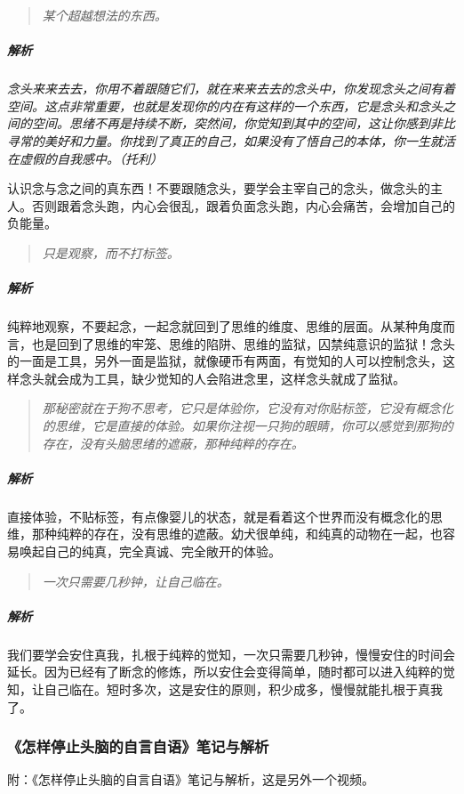 \begin{quote}\it
    某个超越想法的东西。
\end{quote}

\subparagraph{解析} \textit{念头来来去去，你用不着跟随它们，就在来来去去的念头中，你发现念头之间有着空间。这点非常重要，也就是发现你的内在有这样的一个东西，它是念头和念头之间的空间。思绪不再是持续不断，突然间，你觉知到其中的空间，这让你感到非比寻常的美好和力量。你找到了真正的自己，如果没有了悟自己的本体，你一生就活在虚假的自我感中。（托利）}

认识念与念之间的真东西！不要跟随念头，要学会主宰自己的念头，做念头的主人。否则跟着念头跑，内心会很乱，跟着负面念头跑，内心会痛苦，会增加自己的负能量。

\begin{quote}\it
    只是观察，而不打标签。
\end{quote}

\subparagraph{解析} 纯粹地观察，不要起念，一起念就回到了思维的维度、思维的层面。从某种角度而言，也是回到了思维的牢笼、思维的陷阱、思维的监狱，囚禁纯意识的监狱！念头的一面是工具，另外一面是监狱，就像硬币有两面，有觉知的人可以控制念头，这样念头就会成为工具，缺少觉知的人会陷进念里，这样念头就成了监狱。

\begin{quote}\it
    那秘密就在于狗不思考，它只是体验你，它没有对你贴标签，它没有概念化的思维，它是直接的体验。如果你注视一只狗的眼睛，你可以感觉到那狗的存在，没有头脑思绪的遮蔽，那种纯粹的存在。
\end{quote}

\subparagraph{解析} 直接体验，不贴标签，有点像婴儿的状态，就是看着这个世界而没有概念化的思维，那种纯粹的存在，没有思维的遮蔽。幼犬很单纯，和纯真的动物在一起，也容易唤起自己的纯真，完全真诚、完全敞开的体验。

\begin{quote}\it
    一次只需要几秒钟，让自己临在。
\end{quote}

\subparagraph{解析} 我们要学会安住真我，扎根于纯粹的觉知，一次只需要几秒钟，慢慢安住的时间会延长。因为已经有了断念的修炼，所以安住会变得简单，随时都可以进入纯粹的觉知，让自己临在。短时多次，这是安住的原则，积少成多，慢慢就能扎根于真我了。

\subsubsection{《怎样停止头脑的自言自语》笔记与解析}

附：《怎样停止头脑的自言自语》笔记与解析，这是另外一个视频。

